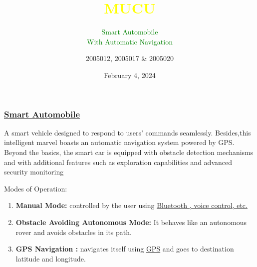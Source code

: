 \documentclass[compress,12pt]{beamer}
\title{\Huge \textcolor{yellow}{MUCU}}
\subtitle{\small \textcolor{green}{Smart Automobile\\ With Automatic Navigation}}
\date{\textcolor{bubbles}{February 4, 2024}}
\author{\textcolor{bubbles}{2005012, 2005017 \& 2005020}}
\institute{\textcolor{bubbles}{Bangladesh University of Engineering and Technology (BUET)}}
\begin{document}
\begin{frame}
  \titlepage
\end{frame}


\begin{frame}
      \frametitle{\textcolor{cadmiumgreen}{\underline{Smart Automobile}}}
    A smart vehicle designed to respond to users' commands seamlessly. Besides,this intelligent marvel boasts an automatic navigation system powered by GPS. Beyond the basics, the smart car is equipped with obstacle detection mechanisms and  with additional features such as exploration capabilities and advanced security monitoring \par
      Modes of Operation:
      \begin{enumerate}[label = \roman*.]
          
            \item<1-> \textcolor{cadmiumgreen}{\textbf{Manual Mode: }}controlled by the user using {\underline{Bluetooth , voice control, etc.}}\\
            \item<2-> \textcolor{cadmiumgreen}{\textbf{Obstacle Avoiding Autonomous Mode:}} It behaves like an autonomous rover and avoids obstacles in its path.
            
            \item<3-> \textcolor{cadmiumgreen}{\textbf{GPS Navigation : }}navigates itself using \underline{GPS} and goes to destination latitude and longitude.
            
               
      \end{enumerate}
\end{frame}
\end{document}
